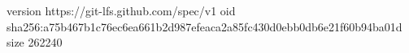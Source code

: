 version https://git-lfs.github.com/spec/v1
oid sha256:a75b467b1c76ec6ea661b2d987efeaca2a85fc430d0ebb0db6e21f60b94ba01d
size 262240
